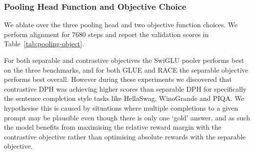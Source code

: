 \subsubsection{Pooling Head Function and Objective Choice} \label{sec:head-objective-ablations}
We ablate over the three pooling head and two objective function choices. We perform alignment for 7680 steps and report the validation scores in Table~\ref{tab:pooling-object}.

\begingroup
\vspace{-12pt}
\setlength{\tabcolsep}{9pt}
\setlength{\extrarowheight}{3pt}
\begin{table}[ht]
\centering
\caption{Comparison of DPH validation scores for different objective and pooler combinations.}
\label{tab:pooling-object}
\vspace*{-0.5\baselineskip}
\end{table}
\endgroup

For both separable and contrastive objectives the SwiGLU pooler performs best on the three benchmarks, and for both GLUE and RACE the separable objective performs best overall. However during these experiments we discovered that contrastive DPH was achieving higher scores than separable DPH for specifically the sentence completion style tasks like HellaSwag, WinoGrande and PIQA. We hypothesise this is caused by situations where multiple completions to a given prompt may be plausible even though there is only one `gold' answer, and as such the model benefits from maximising the relative reward margin with the contrastive objective rather than optimising absolute rewards with the separable objective. 

